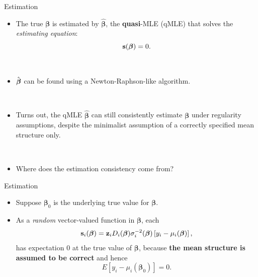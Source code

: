\documentclass{beamer}
\newcommand{\boldbeta}{{\boldsymbol \beta}}
\newenvironment{wideitemize}%
  {\begin{itemize}%
    \setlength{\parskip}{1em}}%
  {\end{itemize}}
\begin{document}
\begin{frame} {Estimation}
\begin{itemize}
\item The true $\boldbeta$ is estimated by ${\boldsymbol \hat{\boldsymbol \beta}}$, the {\bf quasi}-MLE (qMLE) that solves the \emph{estimating equation}:
\[
{\bf s}({\boldsymbol \beta}) = 0.
\] 

\ \
\item
$\hat{\mbox{\boldmath $\beta$}}$ can be found using a Newton-Raphson-like algorithm.

\ \
\item Turns out, the qMLE ${\boldsymbol \hat{\boldsymbol \beta}}$ can still consistently estimate $\boldbeta$ under regularity assumptions, despite the minimalist assumption of a correctly specified mean structure only.


\ \



\item Where does the estimation consistency come from?

\end{itemize}

\end{frame}

\begin{frame} {Estimation}
\begin{wideitemize}

\item Suppose $\boldbeta_0$ is the underlying true value for $\boldbeta$.

\item As a  \emph{random} vector-valued function in $\boldbeta$, each
\[
{\bf s}_i ({\boldsymbol \beta}) = \textbf{z}_i D_i(\mbox{\boldmath $\beta$})
\sigma_i^{-2}(\mbox{\boldmath $\beta$}) \left[y_i-\mu_i(\mbox{\boldmath $\beta$})\right], \]
 has expectation $0$ at  the true value of  $\boldsymbol \beta$, because {\bf the mean structure is assumed to be correct} and hence
 \[
 E[y_i - \mu_i (\boldbeta_0)] = 0.
 \]


\end{wideitemize}

\end{frame}

\end{document}
